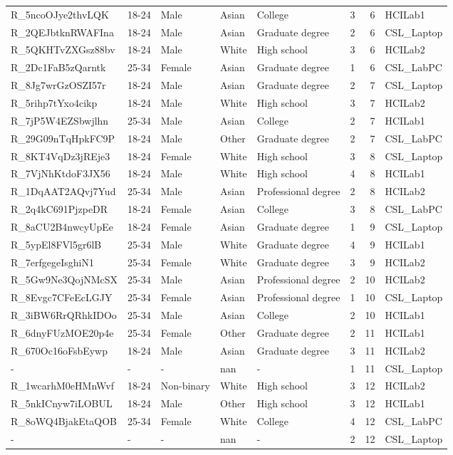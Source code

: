 \documentclass{article}
\begin{document}
\begin{table}
\begin{tabular}{llllllrl}
R\_5ncoOJye2thvLQK & 18-24 & Male & Asian & College & 3 & 6 & HCILab1 \\
R\_2QEJbtknRWAFIna & 18-24 & Male & Asian & Graduate degree & 2 & 6 & CSL\_Laptop \\
R\_5QKHTvZXGsz88bv & 18-24 & Male & White & High school & 3 & 6 & HCILab2 \\
R\_2Dc1FaB5zQarntk & 25-34 & Female & Asian & Graduate degree & 1 & 6 & CSL\_LabPC \\
R\_8Jg7wrGzOSZI57r & 18-24 & Male & Asian & Graduate degree & 2 & 7 & CSL\_Laptop \\
R\_5rihp7tYxo4cikp & 18-24 & Male & White & High school & 3 & 7 & HCILab2 \\
R\_7jP5W4EZSbwjlhn & 25-34 & Male & Asian & College & 2 & 7 & HCILab1 \\
R\_29G09nTqHpkFC9P & 18-24 & Male & Other & Graduate degree & 2 & 7 & CSL\_LabPC \\
R\_8KT4VqDz3jREje3 & 18-24 & Female & White & High school & 3 & 8 & CSL\_Laptop \\
R\_7VjNhKtdoF3JX56 & 18-24 & Male & White & High school & 4 & 8 & HCILab1 \\
R\_1DqAAT2AQvj7Yud & 25-34 & Male & Asian & Professional degree & 2 & 8 & HCILab2 \\
R\_2q4kC691PjzpeDR & 18-24 & Female & Asian & College & 3 & 8 & CSL\_LabPC \\
R\_8aCU2B4nwcyUpEe & 18-24 & Female & Asian & Graduate degree & 1 & 9 & CSL\_Laptop \\
R\_5ypEl8FVl5gr6lB & 25-34 & Male & White & Graduate degree & 4 & 9 & HCILab1 \\
R\_7erfgegeIsghiN1 & 25-34 & Female & White & Graduate degree & 3 & 9 & HCILab2 \\
R\_5Gw9Ne3QojNMcSX & 25-34 & Male & Asian & Professional degree & 2 & 10 & HCILab2 \\
R\_8Evgc7CFeEcLGJY & 25-34 & Female & Asian & Professional degree & 1 & 10 & CSL\_Laptop \\
R\_3iBW6RrQRhkIDOo & 25-34 & Male & Asian & College & 2 & 10 & HCILab1 \\
R\_6dnyFUzMOE20p4e & 25-34 & Female & Other & Graduate degree & 2 & 11 & HCILab1 \\
R\_670Oc16oFsbEywp & 18-24 & Male & Asian & Graduate degree & 3 & 11 & HCILab2 \\
- & - & - & nan & - & 1 & 11 & CSL\_Laptop \\
R\_1wcarhM0eHMnWvf & 18-24 & Non-binary & White & High school & 3 & 12 & HCILab2 \\
R\_5nkICnyw7iLOBUL & 18-24 & Male & Other & High school & 3 & 12 & HCILab1 \\
R\_8oWQ4BjakEtaQOB & 25-34 & Female & White & College & 4 & 12 & CSL\_LabPC \\
- & - & - & nan & - & 2 & 12 & CSL\_Laptop \\
\bottomrule
\end{tabular}
\end{table}
    
\end{document}
